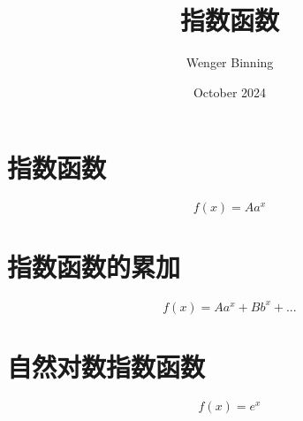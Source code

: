 \documentclass{article}
\title{指数函数}
\author{Wenger Binning }
\date{October 2024}
\begin{document}
\maketitle

\section{指数函数}

$$ f(x) = Aa^x $$

\section{指数函数的累加}

$$ f(x) = Aa^x + Bb^x + ... $$

\section{自然对数指数函数}

$$ f(x) = e^x $$
\end{document}
